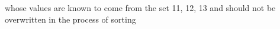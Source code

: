 \documentclass[preview]{standalone}
\begin{document}
\begin{center}
whose values are known to come from the set {11, 12, 13} and should not be
overwritten in the process of sorting
\end{center}
\end{document}
